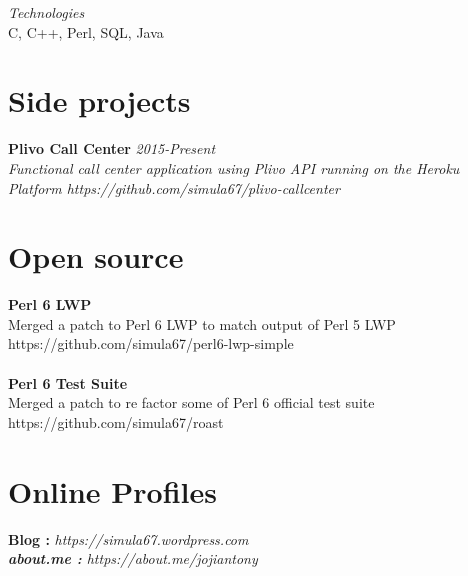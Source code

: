 \documentclass[line,margin]{res}
\begin{document}
\begin{resume}
{\it{Technologies}}\\
C, C++, Perl, SQL, Java

\section{Side projects}
{\bf Plivo Call Center} \hfill \it{2015-Present}\\
Functional call center application using Plivo API running on the Heroku Platform
https://github.com/simula67/plivo-callcenter\\


\section{Open source}
{\bf Perl 6 LWP}\\
Merged a patch to Perl 6 LWP to match output of Perl 5 LWP\\
https://github.com/simula67/perl6-lwp-simple\\ \\
{\bf Perl 6 Test Suite}\\
Merged a patch to re factor some of Perl 6 official test suite\\
https://github.com/simula67/roast\\

\section{Online Profiles}
{\bf Blog :} \it{https://simula67.wordpress.com} \\
{\bf about.me :} \it{https://about.me/jojiantony} \\


\end{resume}
\end{document}
